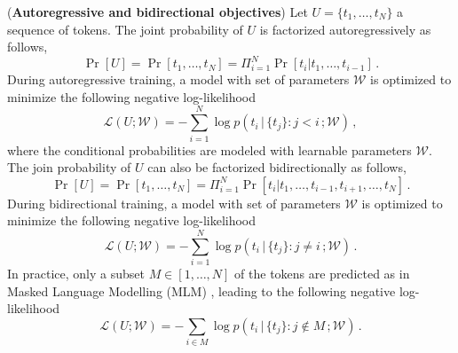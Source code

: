 \begin{definition}
\label{def-objective-functions}
%
(\textbf{Autoregressive and bidirectional objectives})
%
Let $U = \{t_1, \dots, t_N\}$ a sequence of tokens.
%
The joint probability of $U$ is factorized autoregressively as follows,
%
\begin{equation}
    \Pr[U] = \Pr[t_1,\dots,t_N] = \Pi_{i=1}^N \Pr[t_i|t_1,\dots,t_{i-1}]\,.
\end{equation}
%
During autoregressive training, a model with set of parameters $\mathcal{W}$ is optimized to minimize the following negative log-likelihood
%
\begin{equation}
\mathcal{L}(U; \mathcal{W}) = - \sum_{i=1}^{N} \log p(t_i \,|\, \{t_j\} : j < i\,; \mathcal{W})\,,
\end{equation}
%
where the conditional probabilities are modeled with learnable parameters $\mathcal{W}$.
%
The join probability of $U$ can also be factorized bidirectionally as follows,
%
\begin{equation}
    \Pr[U] = \Pr[t_1,\dots,t_N] = \Pi_{i=1}^N \Pr[t_i|t_1,\dots,t_{i-1}, t_{i+1}, \dots, t_N]\,.
\end{equation}
%
During bidirectional training, a model with set of parameters $\mathcal{W}$ is optimized to minimize the following negative log-likelihood
%
\begin{equation}
\mathcal{L}(U; \mathcal{W}) = - \sum_{i=1}^{N} \log p(t_i \,|\, \{t_j\} : j \neq i\,; \mathcal{W})\,.
\end{equation}
%
In practice, only a subset $M\in [1,\dots,N]$ of the tokens are predicted as in  Masked Language Modelling (MLM) \cite[see ][]{devlinBERTPretrainingDeep2019,warnerSmarterBetterFaster2024}, leading to the following negative log-likelihood
%
\begin{equation}
\mathcal{L}(U; \mathcal{W}) = - \sum_{i\in M} \log p(t_i \,|\, \{t_j\} : j \notin M\,; \mathcal{W})\,.
\end{equation}
%
\end{definition}